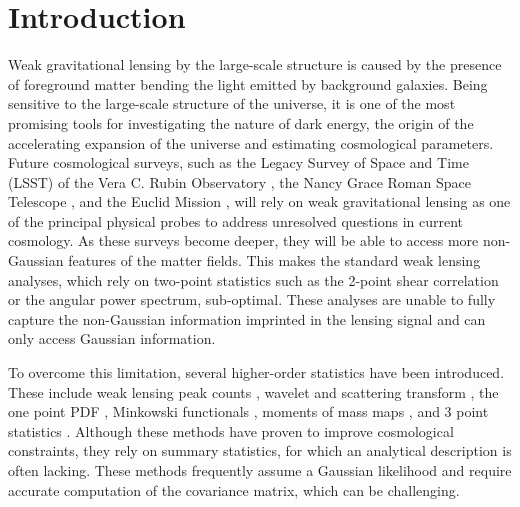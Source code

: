 \documentclass{aa}
\begin{document}
   \maketitle

\section{Introduction}
Weak gravitational lensing by the large-scale structure is caused by the presence of foreground matter bending the light emitted by background galaxies. Being sensitive to the large-scale structure of the universe, it is one of the most promising tools for investigating the nature of dark energy, the origin of the accelerating expansion of the universe and estimating cosmological parameters. Future cosmological surveys, such as the Legacy Survey of Space and Time (LSST) of the Vera C. Rubin Observatory \citep{ivezic2019lsst}, the Nancy Grace Roman Space Telescope \citep{spergel2015wide}, and  the Euclid Mission \citep{laureijs2011euclid}, will rely on weak gravitational lensing as one of the principal physical probes to address unresolved questions in current cosmology.
 As these surveys become deeper, they will be able to access more non-Gaussian features of the matter fields. This makes the standard weak lensing analyses, which rely on two-point statistics such as the 2-point shear correlation or the angular power spectrum, sub-optimal. These analyses are unable to fully capture the non-Gaussian information imprinted in the lensing signal and can only access Gaussian information.


To overcome this limitation, several higher-order statistics have been introduced. These include weak lensing peak counts \citep{liu2015cosmology,  liu2015cosmological, lin2015new, kacprzak2016cosmology, peel2017cosmological, shan2018kids, martinet2018kids, ajani2020constraining, harnois2021cosmic, zurcher2022dark}, wavelet and scattering transform \citep{ajani2021starlet, cheng2021weak}, the one point PDF \citep{liu2019constraining, uhlemann2020fisher, boyle2021nuw}, Minkowski functionals \citep{kratochvil2012probing, petri2013cosmology}, moments of mass maps \citep{gatti2021dark},  and 3 point statistics \citep{takada2004cosmological, semboloni2011weak, rizzato2019tomographic, halder2021integrated}. 
Although these methods have proven to improve cosmological constraints, they rely on summary statistics, for which an analytical description is often lacking. These methods frequently assume a Gaussian likelihood and require accurate computation of the covariance matrix, which can be challenging.
\end{document}
